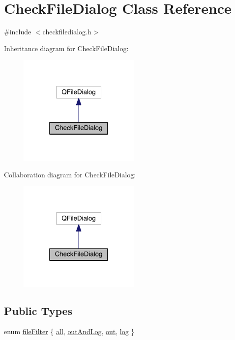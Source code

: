 \hypertarget{class_check_file_dialog}{}\section{Check\+File\+Dialog Class Reference}
\label{class_check_file_dialog}


{\ttfamily \#include $<$checkfiledialog.\+h$>$}



Inheritance diagram for Check\+File\+Dialog\+:
\nopagebreak
\begin{figure}[H]
\begin{center}
\leavevmode
\includegraphics[width=169pt]{class_check_file_dialog__inherit__graph}
\end{center}
\end{figure}


Collaboration diagram for Check\+File\+Dialog\+:
\nopagebreak
\begin{figure}[H]
\begin{center}
\leavevmode
\includegraphics[width=169pt]{class_check_file_dialog__coll__graph}
\end{center}
\end{figure}
\subsection*{Public Types}
\begin{DoxyCompactItemize}
\item 
enum \hyperlink{class_check_file_dialog_aef425279166ddf0cec2e153d80893e80}{file\+Filter} \{ \hyperlink{class_check_file_dialog_aef425279166ddf0cec2e153d80893e80a422bcf31fdb409430f93a05d2384321e}{all}, 
\hyperlink{class_check_file_dialog_aef425279166ddf0cec2e153d80893e80a89aef0892b65192e684d3ea6a6e824f4}{out\+And\+Log}, 
\hyperlink{class_check_file_dialog_aef425279166ddf0cec2e153d80893e80ac75e4d0b89211bb2effd4e1c87275247}{out}, 
\hyperlink{class_check_file_dialog_aef425279166ddf0cec2e153d80893e80a875d4434eae42b0410509ba327d3933e}{log}
 \}
\end{DoxyCompactItemize}
